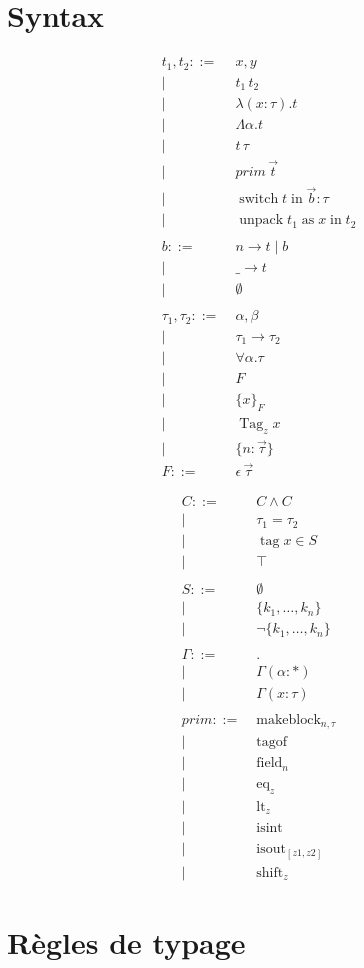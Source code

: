 \documentclass{article}
\newcommand\term{t}
\newcommand\ty{\tau}
\newcommand\tyenv{\Gamma}
\newcommand\var{x}
\newcommand\tyvar{\alpha}
\newcommand\binding[2]{(#1 : #2)}
\newcommand\kw[1]{\operatorname{#1}}
\newcommand\syn[1]{#1 ::=& \; }
\newcommand\synor{\\ |& \; }
\begin{document}
\newcommand\pator{\;|\;}

\newcommand\redto[2]{#1 \longrightarrow #2}

\section{Syntax}

\begin{multicols}{2}
\begin{align*}
  \syn{\term_1, \term_2} \var, y
  \synor      \term_1 \, \term_2
  \synor      \lambda \binding{\var}{\ty} . \term
  \synor      \Lambda \tyvar . \term
  \synor      \term \, \ty
  \synor      prim \, \vec{\term}
  \synor      \kw{switch} \term \kw{in} \vec{b} : \ty
  \synor      \kw{unpack} \term_1 \kw{as} \var \kw{in} \term_2
%
  \\ \\
%
  \syn{b} n \rightarrow \term \; | \; b
  \synor  \_ \rightarrow \term
  \synor  \emptyset
%
  \\ \\
%
  \syn{\ty_1, \ty_2} \tyvar, \beta
  \synor  \ty_1 \rightarrow \ty_2
  \synor  \forall \tyvar. \ty
  \synor  F
  \synor  \{ \var \}_F
  \synor  \kw{Tag}_z \var
  \synor  \{ n: \vec{\ty} \}
  \\
  \syn{F} \epsilon \, \vec{\ty}
\end{align*}
   
\begin{align*}
  \syn{C} C \wedge C
  \synor  \ty_1 = \ty_2
  \synor  \kw{tag} \var \in S
  \synor  \top
%
  \\ \\
%
  \syn{S} \emptyset
  \synor  \{ k_1, \ldots, k_n \}
  \synor  \lnot \{ k_1, \ldots, k_n \}
%
  \\ \\
%
  \syn{\tyenv} .
  \synor \tyenv \binding{\alpha}{*}
  \synor \tyenv \binding{\var}{\ty}
%
  \\ \\
%
  \syn{prim} \kw{makeblock}_{n,\ty}
  \synor \kw{tagof}
  \synor \kw{field}_{n}
  \synor \kw{eq}_{z}
  \synor \kw{lt}_{z}
  \synor \kw{isint}
  \synor \kw{isout}_{[z1,z2]}
  \synor \kw{shift}_{z}
\end{align*}
\end{multicols}

\section{Règles de typage}
\end{document}
